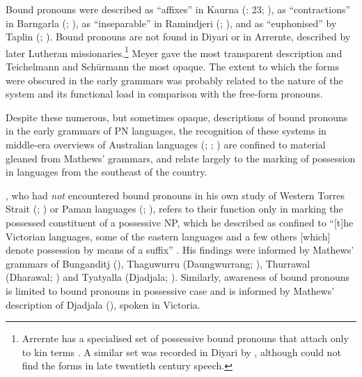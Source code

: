 Bound pronouns were described as “affixes” in Kaurna (\citealt{TeichelmannSchürmann1840}: 23; ), as “contractions” in Barngarla (\citealt[22]{schurmann_vocabulary_1844}; ), as “inseparable” in Ramindjeri (\citealt[23]{meyer_vocabulary_1843}; ), and as “euphonised” by Taplin (\citeyear[no pag.]{taplin_vocabulary_1867}; ). Bound pronouns are not found in Diyari or in Arrernte, described by later Lutheran missionaries.\footnote{Arrernte has a specialised set of possessive bound pronouns that attach only to kin terms \citep[133--135]{wilkins_mparntwe_1989}. A similar set was recorded in Diyari by \citet{reuther_dieri_1894}, although \citet[56--57]{austin_grammar_2013} could not find the forms in late twentieth century speech.}  Meyer gave the most transparent description and Teichelmann and Schürmann the most opaque. The extent to which the forms were obscured in the early grammars was probably related to the nature of the system and its functional load in comparison with the free-form pronouns.

Despite these numerous, but sometimes opaque, descriptions of bound pronouns in the early grammars of PN languages, the recognition of these systems in middle-era overviews of Australian languages (\citealt{ray_aboriginal_1925}; \citealt{capell_structure_1937}; \citealt{elkin_nature_1937}) are confined to material gleaned from Mathews' grammars, and relate largely to the marking of possession in languages from the southeast of the country.

\citet{ray_aboriginal_1925}, who had \textit{not} encountered bound pronouns in his own study of Western Torres Strait (\citeyear{ray_study_1893}; \citeyear{ray_linguistics_1907}) or Paman languages (\citeyear{ray_linguistics_1907}; ), refers to their function only in marking the possessed constituent of a possessive NP, which he described as confined to “[t]he Victorian languages, some of the eastern languages and a few others [which] denote possession by means of a suffix” \citep[5]{ray_aboriginal_1925}. His findings were informed by Mathews' grammars of Bunganditj (\citeyear{mathews_language_1903}), Thaguwurru (Daungwurrang; \citeyear{mathews_aboriginal_1902}), Thurrawal (Dharawal; \citeyear{mathews_gundungurra_1901}) and Tyatyalla (Djadjala; \citeyear{mathews_aboriginal_1902}). Similarly,  awareness of bound pronouns is limited to bound pronouns in possessive case and is informed by Mathews' description of Djadjala (\citealt{mathews_aboriginal_1902}), spoken in Victoria.

